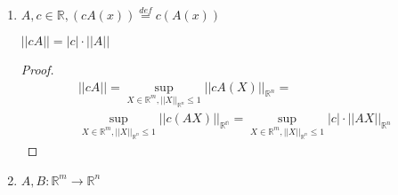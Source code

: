 \documentclass[main]{subfiles}
\begin{document}
\begin{enumerate}
\begin{proof}
        $1 \leq i \leq n, 1 \leq j \leq m$ не зависят друг от друга.
        \newline
        $e_i = (0, \ldots, \underbrace{1}_i, \ldots 0)$
        $f_j = \begin{pmatrix}
            0 \\
            \vdots \\
            \underbrace{1}_j \\
            \vdots \\
            0 \\ \end{pmatrix}$
        \newline
        $||A|| = 0 \Rightarrow Af_j = \mathbb{0}_{\mathbb{R}^n} $.
        $Af_j =
        \begin{pmatrix}
            a_{1j} \\
            a_{2j}\\
            \vdots \\
            a_{nj}
        \end{pmatrix} $
        Теперь рассмотрим $e_i \underbrace{(Af_j)}_{\mathbb{0}_{\mathbb{R}^n}} =$
        $ (0 \ldots 1 \ldots) \begin{pmatrix}
            0 \\
            \vdots \\
            1 \\
            \vdots \\
            0 \\ \end{pmatrix}$ = $a_{ij} = 0$
    \end{proof}
    \item $A, c \in \mathbb{R}, (cA(x)) \stackrel{def}{=} c(A(x))$ 
    \begin{theorem}$||cA|| = |c| \cdot ||A||$ \end{theorem}
    \begin{proof}
        $$
        \begin{gathered}
        ||cA|| = \underset{X \in \mathbb{R}^m, ||X||_{\mathbb{R}^n}\leq 1}{\sup}||cA(X)||_{\mathbb{R}^n} = \\
        \underset{X \in \mathbb{R}^m, ||X||_{\mathbb{R}^n}\leq 1}{\sup} ||c(AX)||_{\mathbb{R^n}}
        =\underset{X \in \mathbb{R}^m, ||X||_{\mathbb{R}^n}\leq 1}{\sup} |c| \cdot ||AX||_{\mathbb{R}^n}
        \end{gathered} $$
    \end{proof}
    \item $A, B : \mathbb{R}^m \rightarrow \mathbb{R}^n$

\end{enumerate}
\end{document}
